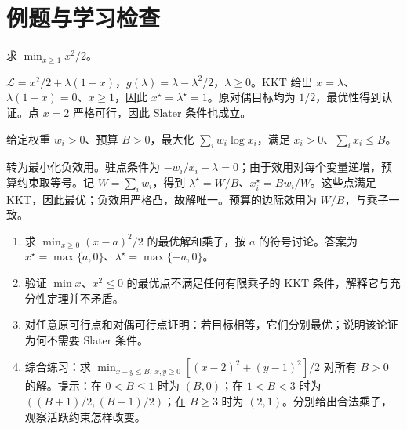 \section{例题与学习检查}
\begin{example}
求 $\min_{x\geq1}x^2/2$。
\end{example}
\begin{solve}
$\mathcal L=x^2/2+\lambda(1-x)$，$g(\lambda)=\lambda-\lambda^2/2$，$\lambda\geq0$。KKT 给出 $x=\lambda$、$\lambda(1-x)=0$、$x\geq1$，因此 $x^\star=\lambda^\star=1$。原对偶目标均为 $1/2$，最优性得到认证。点 $x=2$ 严格可行，因此 Slater 条件也成立。
\end{solve}

\begin{example}[比例资源分配]
给定权重 $w_i>0$、预算 $B>0$，最大化 $\sum_iw_i\log x_i$，满足 $x_i>0$、$\sum_i x_i\leq B$。
\end{example}
\begin{solve}
转为最小化负效用。驻点条件为 $-w_i/x_i+\lambda=0$；由于效用对每个变量递增，预算约束取等号。记 $W=\sum_iw_i$，得到 $\lambda^\star=W/B$、$x_i^\star=Bw_i/W$。这些点满足 KKT，因此最优；负效用严格凸，故解唯一。预算的边际效用为 $W/B$，与乘子一致。
\end{solve}
\begin{enumerate}
 \item 求 $\min_{x\geq0}(x-a)^2/2$ 的最优解和乘子，按 $a$ 的符号讨论。答案为 $x^\star=\max\{a,0\}$、$\lambda^\star=\max\{-a,0\}$。
 \item 验证 $\min x$、$x^2\leq0$ 的最优点不满足任何有限乘子的 KKT 条件，解释它与充分性定理并不矛盾。
 \item 对任意原可行点和对偶可行点证明：若目标相等，它们分别最优；说明该论证为何不需要 Slater 条件。
 \item 综合练习：求 $\min_{x+y\leq B,\ x,y\geq0}[(x-2)^2+(y-1)^2]/2$ 对所有 $B>0$ 的解。提示：在 $0<B\leq1$ 时为 $(B,0)$；在 $1<B<3$ 时为 $((B+1)/2,(B-1)/2)$；在 $B\geq3$ 时为 $(2,1)$。分别给出合法乘子，观察活跃约束怎样改变。
\end{enumerate}

